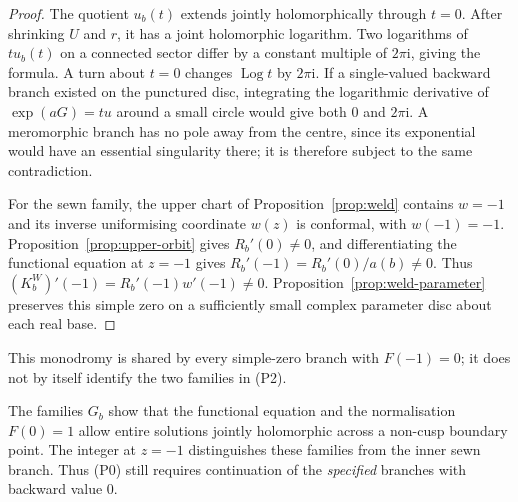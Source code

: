 \documentclass[11pt,a4paper]{article}
\theoremstyle{definition}
\newcommand{\Rr}{R}
\newcommand{\Kk}{K}
\newcommand{\ii}{\mathrm{i}}
\begin{document}
\begin{proof}
The quotient $u_b(t)$ extends jointly holomorphically through $t=0$.
After shrinking $U$ and $r$, it has a joint holomorphic logarithm.
Two logarithms of $t u_b(t)$ on a connected sector differ by a constant
multiple of $2\pi\ii$, giving the formula.  A turn about $t=0$ changes
$\operatorname{Log}t$ by $2\pi\ii$.  If a single-valued backward branch existed on
the punctured disc, integrating the logarithmic derivative of
$\exp(aG)=t u$ around a small circle would give both $0$ and $2\pi\ii$.
A meromorphic branch has no pole away from the centre, since its
exponential would have an essential singularity there; it is therefore
subject to the same contradiction.

For the sewn family, the upper chart of Proposition~\ref{prop:weld}
contains $w=-1$ and its inverse uniformising coordinate $w(z)$ is
conformal, with $w(-1)=-1$.  Proposition~\ref{prop:upper-orbit} gives
$\Rr_b'(0)\ne0$, and differentiating the functional equation at
$z=-1$ gives
$\Rr_b'(-1)=\Rr_b'(0)/a(b)\ne0$.  Thus
$(\Kk_b^W)'(-1)=\Rr_b'(-1)w'(-1)\ne0$.
Proposition~\ref{prop:weld-parameter} preserves this simple zero on
a sufficiently small complex parameter disc about each real base.
\end{proof}

This monodromy is shared by every simple-zero branch with $F(-1)=0$;
it does not by itself identify the two families in (P2).

The families $G_b$ show that the functional equation and the normalisation
$F(0)=1$ allow entire solutions jointly holomorphic across a non-cusp
boundary point.  The integer at $z=-1$ distinguishes these families
from the inner sewn branch.  Thus (P0) still requires continuation of
the \emph{specified} branches with backward value $0$.
\end{document}
